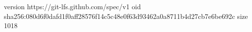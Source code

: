 version https://git-lfs.github.com/spec/v1
oid sha256:080d6f0dafd1f0aff28576f14c5c48e0f63d93462a0a8711b4d27cb7e6be692c
size 1018
